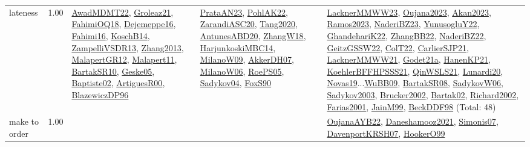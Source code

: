 {\begin{longtable}{p{3cm}r>{\raggedright\arraybackslash}p{6cm}>{\raggedright\arraybackslash}p{6cm}>{\raggedright\arraybackslash}p{8cm}}
\index{lateness}\index{Concepts!lateness}lateness &  1.00 & \hyperref[detail:AwadMDMT22]{AwadMDMT22}, \hyperref[detail:Groleaz21]{Groleaz21}, \hyperref[detail:FahimiOQ18]{FahimiOQ18}, \hyperref[detail:Dejemeppe16]{Dejemeppe16}, \hyperref[detail:Fahimi16]{Fahimi16}, \hyperref[detail:KoschB14]{KoschB14}, \hyperref[detail:ZampelliVSDR13]{ZampelliVSDR13}, \hyperref[detail:Zhang2013]{Zhang2013}, \hyperref[detail:MalapertGR12]{MalapertGR12}, \hyperref[detail:Malapert11]{Malapert11}, \hyperref[detail:BartakSR10]{BartakSR10}, \hyperref[detail:Geske05]{Geske05}, \hyperref[detail:Baptiste02]{Baptiste02}, \hyperref[detail:ArtiguesR00]{ArtiguesR00}, \hyperref[detail:BlazewiczDP96]{BlazewiczDP96} & \hyperref[detail:PrataAN23]{PrataAN23}, \hyperref[detail:PohlAK22]{PohlAK22}, \hyperref[detail:ZarandiASC20]{ZarandiASC20}, \hyperref[detail:Tang2020]{Tang2020}, \hyperref[detail:AntunesABD20]{AntunesABD20}, \hyperref[detail:ZhangW18]{ZhangW18}, \hyperref[detail:HarjunkoskiMBC14]{HarjunkoskiMBC14}, \hyperref[detail:MilanoW09]{MilanoW09}, \hyperref[detail:AkkerDH07]{AkkerDH07}, \hyperref[detail:MilanoW06]{MilanoW06}, \hyperref[detail:RoePS05]{RoePS05}, \hyperref[detail:Sadykov04]{Sadykov04}, \hyperref[detail:FoxS90]{FoxS90} & \hyperref[detail:LacknerMMWW23]{LacknerMMWW23}, \hyperref[detail:Oujana2023]{Oujana2023}, \hyperref[detail:Akan2023]{Akan2023}, \hyperref[detail:Ramos2023]{Ramos2023}, \hyperref[detail:NaderiBZ23]{NaderiBZ23}, \hyperref[detail:YunusogluY22]{YunusogluY22}, \hyperref[detail:GhandehariK22]{GhandehariK22}, \hyperref[detail:ZhangBB22]{ZhangBB22}, \hyperref[detail:NaderiBZ22]{NaderiBZ22}, \hyperref[detail:GeitzGSSW22]{GeitzGSSW22}, \hyperref[detail:ColT22]{ColT22}, \hyperref[detail:CarlierSJP21]{CarlierSJP21}, \hyperref[detail:LacknerMMWW21]{LacknerMMWW21}, \hyperref[detail:Godet21a]{Godet21a}, \hyperref[detail:HanenKP21]{HanenKP21}, \hyperref[detail:KoehlerBFFHPSSS21]{KoehlerBFFHPSSS21}, \hyperref[detail:QinWSLS21]{QinWSLS21}, \hyperref[detail:Lunardi20]{Lunardi20}, \hyperref[detail:Novas19]{Novas19}...\hyperref[detail:WuBB09]{WuBB09}, \hyperref[detail:BartakSR08]{BartakSR08}, \hyperref[detail:SadykovW06]{SadykovW06}, \hyperref[detail:Sadykov2003]{Sadykov2003}, \hyperref[detail:Brucker2002]{Brucker2002}, \hyperref[detail:Bartak02]{Bartak02}, \hyperref[detail:Richard2002]{Richard2002}, \hyperref[detail:Farias2001]{Farias2001}, \hyperref[detail:JainM99]{JainM99}, \hyperref[detail:BeckDDF98]{BeckDDF98} (Total: 48)\\
\index{make to order}\index{Concepts!make to order}make to order &  1.00 &  &  & \hyperref[detail:OujanaAYB22]{OujanaAYB22}, \hyperref[detail:Daneshamooz2021]{Daneshamooz2021}, \hyperref[detail:Simonis07]{Simonis07}, \hyperref[detail:DavenportKRSH07]{DavenportKRSH07}, \hyperref[detail:HookerO99]{HookerO99}\\

\end{longtable}}
